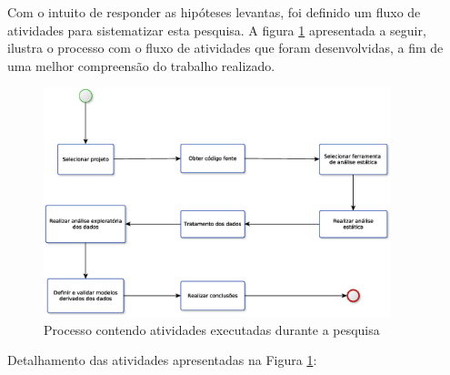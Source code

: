 Com o intuito de responder as hipóteses levantas, foi definido um fluxo de
atividades para sistematizar esta pesquisa. A figura \ref{fig:processo}
apresentada a seguir, ilustra o processo com o fluxo de atividades que foram
desenvolvidas, a fim de uma melhor compreensão do trabalho realizado.

\begin{figure}[h]
  \centering
  \includegraphics[width=0.9\textwidth]
      {figuras/metodologia_processo.eps}
  \caption{Processo contendo atividades executadas durante a pesquisa}
  \label{fig:processo}
\end{figure}

Detalhamento das atividades apresentadas na Figura \ref{fig:processo}:

